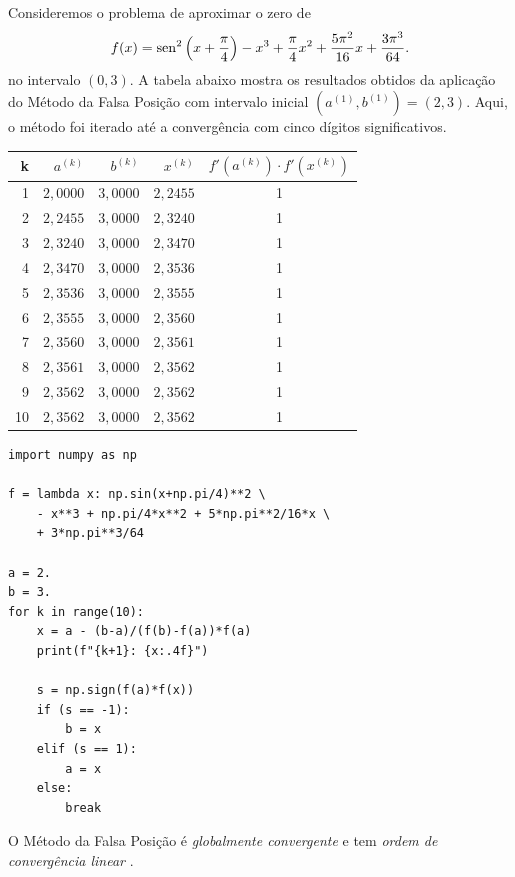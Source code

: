 \begin{ex}
  Consideremos o problema de aproximar o zero de
\begin{equation}
  f(x) = \operatorname{sen}^2\left(x+\frac{\pi}{4}\right) - x^3 + \frac{\pi}{4}x^2 + \frac{5\pi^2}{16}x + \frac{3\pi^3}{64}.
\end{equation}
no intervalo $(0, 3)$. A tabela abaixo mostra os resultados obtidos da aplicação do Método da Falsa Posição com intervalo inicial $(a^{(1)}, b^{(1)}) = (2, 3)$. Aqui, o método foi iterado até a convergência com cinco dígitos significativos.

\begin{center}
  \begin{tabular}{r|rr|r|c}
    k & $a^{(k)}$ & $b^{(k)}$ & $x^{(k)}$ & $f'(a^{(k)})\cdot f'(x^{(k)})$\\\hline
    1 & $2,0000$ & $3,0000$ & $2,2455$ & 1 \\
    2 & $2,2455$ & $3,0000$ & $2,3240$ &  1 \\
    3 & $2,3240$ & $3,0000$ & $2,3470$ & 1 \\
    4 & $2,3470$ & $3,0000$ & $2,3536$ & 1 \\
    5 & $2,3536$ & $3,0000$ & $2,3555$ & 1 \\
    6 & $2,3555$ & $3,0000$ & $2,3560$ & 1 \\
    7 & $2,3560$ & $3,0000$ & $2,3561$ &  1 \\
    8 & $2,3561$ & $3,0000$ & $2,3562$ & 1 \\
    9 & $2,3562$ & $3,0000$ & $2,3562$ & 1 \\
    10 & $2,3562$ & $3,0000$ & $2,3562$ & 1 \\\hline
  \end{tabular}
\end{center}

\begin{lstlisting}
import numpy as np

f = lambda x: np.sin(x+np.pi/4)**2 \
    - x**3 + np.pi/4*x**2 + 5*np.pi**2/16*x \
    + 3*np.pi**3/64

a = 2.
b = 3.
for k in range(10):
    x = a - (b-a)/(f(b)-f(a))*f(a)
    print(f"{k+1}: {x:.4f}")

    s = np.sign(f(a)*f(x))
    if (s == -1):
        b = x
    elif (s == 1):
        a = x
    else:
        break
\end{lstlisting}
\end{ex}

\begin{obs}
  O Método da Falsa Posição é \emph{globalmente convergente} e tem \emph{ordem de convergência linear} \cite[Seção 8.3]{Ralston2001a}.
\end{obs}

